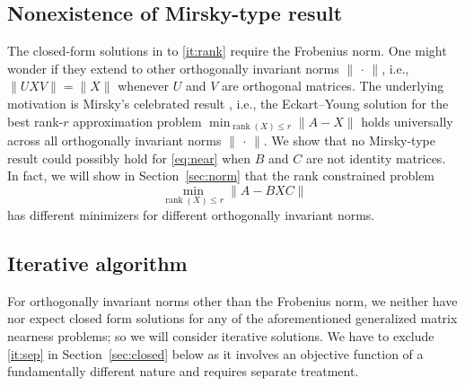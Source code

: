 \documentclass[11pt,reqno]{amsart}
\DeclareMathOperator{\rank}{rank}
\theoremstyle{definition}
\numberwithin{equation}{section}
\begin{document}
\subsection{Nonexistence of Mirsky-type result}\label{sec:imposs}

The closed-form solutions in \cite{Sondermann, Fri, li22} to \ref{it:rank} require the Frobenius norm. One might wonder if they extend to other orthogonally invariant norms $\lVert \, \cdot \, \rVert$, i.e.,  $\lVert UXV \rVert = \lVert X \rVert$ whenever $U$ and $V$ are orthogonal matrices. The underlying motivation is Mirsky's celebrated result \cite{mir}, i.e., the Eckart--Young solution \cite{Eck} for the  best rank-$r$ approximation problem $\min_{\rank(X)\le r} \lVert A- X\rVert$  holds universally across all orthogonally invariant norms $\lVert \, \cdot \, \rVert$.  We show that no Mirsky-type result could possibly hold for \eqref{eq:near} when $B$ and $C$ are not identity matrices.  In fact, we will show in Section~\ref{sec:norm} that the rank constrained problem
\[
    \min_{\rank(X) \le r} \lVert A- BXC\rVert
\]
has different minimizers for different orthogonally invariant norms.

\subsection{Iterative algorithm}\label{sec:algo}

For orthogonally invariant norms other than the Frobenius norm, we neither have nor expect closed form solutions for any of the aforementioned generalized matrix nearness problems; so we will consider iterative solutions. We have to exclude \ref{it:sep} in Section~\ref{sec:closed} below as it involves an objective function of a fundamentally different nature and requires separate treatment.
\end{document}
